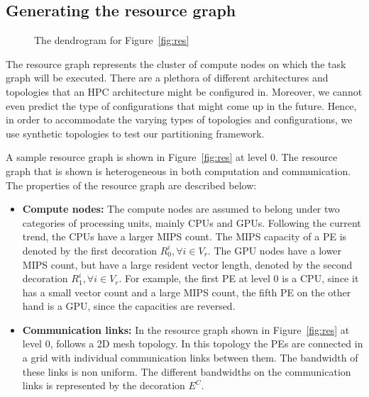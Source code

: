 \subsection{Generating the resource graph}
\label{sec:gener-reso-graph}

\begin{figure}[t!]
  \centering
  \scalebox{0.4}{}
  \caption{The dendrogram for Figure~\ref{fig:res}}
  \label{fig:7}
\end{figure}

The resource graph represents the cluster of compute nodes on which the
task graph will be executed. There are a plethora of different
architectures and topologies that an HPC architecture might be
configured in. Moreover, we cannot even predict the type of
configurations that might come up in the future. Hence, in order to
accommodate the varying types of topologies and configurations, we use
synthetic topologies to test our partitioning framework.

A sample resource graph is shown in Figure~\ref{fig:res} at level 0. The
resource graph that is shown is heterogeneous in both computation and
communication. The properties of the resource graph are described below:

\begin{itemize}

\item \textbf{Compute nodes:} The compute nodes are assumed to belong
  under two categories of processing units, mainly CPUs and
  GPUs. Following the current trend, the CPUs have a larger MIPS
  count. The MIPS capacity of a PE is denoted by the first decoration
  $R^i_0, \forall i \in V_r$. The GPU nodes have a lower MIPS count, but
  have a large resident vector length, denoted by the second decoration
  $R^i_1, \forall i \in V_r$. For example, the first PE at level 0 is a
  CPU, since it has a small vector count and a large MIPS count, the
  fifth PE on the other hand is a GPU, since the capacities are
  reversed.



\item \textbf{Communication links:} In the resource graph shown in
  Figure~\ref{fig:res} at level 0, follows a 2D mesh topology. In this
  topology the PEs are connected in a grid with individual communication
  links between them. The bandwidth of these links is non
  uniform. The different bandwidths on the communication links is
  represented by the decoration $E^C$.

\end{itemize}

